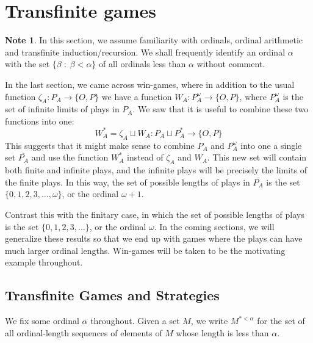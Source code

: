 \documentclass[11pt]{article} %
\theoremstyle{plain} %
\theoremstyle{definition} %
\theoremstyle{note}
\newtheorem{note}[theorem]{Note}
\theoremstyle{exercisestyle}
\newcommand*\from{\colon}
\newcommand{\cmap}[3]{#1\from{}#2\to{}#3}
\newcommand{\cprd}{\sqcup}
\newcommand{\suchthat}{\;\colon\;}
\newcommand{\OP}{\{O,P\}}
\begin{document}
\section{Transfinite games}

\begin{note}
  In this section, we assume familiarity with ordinals, ordinal arithmetic and transfinite induction/recursion.  We shall frequently identify an ordinal $\alpha$ with the set $\{\beta\suchthat\beta<\alpha\}$ of all ordinals less than $\alpha$ without comment.
\end{note}

In the last section, we came across win-games, where in addition to the usual function $\cmap{\zeta_A}{P_A}{\OP}$ we have a function $\cmap{W_A}{P_A^\omega}{\OP}$, where $P_A^\omega$ is the set of infinite limits of plays in $P_A$.  We saw that it is useful to combine these two functions into one:
\[
  W_A^* = \zeta_A\cprd W_A\from P_A\cprd P_A^*\to\OP
  \]
This suggests that it might make sense to combine $P_A$ and $P_A^\omega$ into one a single set $\overline{P_A}$ and use the function $W_A^*$ instead of $\zeta_A$ and $W_A$.  This new set will contain both finite and infinite plays, and the infinite plays will be precisely the limits of the finite plays.  In this way, the set of possible lengths of plays in $\overline{P_A}$ is the set $\{0,1,2,3,\dots,\omega\}$, or the ordinal $\omega+1$.  

Contrast this with the finitary case, in which the set of possible lengths of plays is the set $\{0,1,2,3,\dots\}$, or the ordinal $\omega$.  In the coming sections, we will generalize these results so that we end up with games where the plays can have much larger ordinal lengths.  Win-games will be taken to be the motivating example throughout.  

\subsection{Transfinite Games and Strategies}

We fix some ordinal $\alpha$ throughout.  Given a set $M$, we write $M^{*<\alpha}$ for the set of all ordinal-length sequences of elements of $M$ whose length is less than $\alpha$.  
\end{document}
